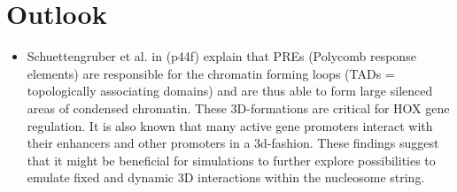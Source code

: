 \chapter{Outlook}
\label{cha:outlook}

\begin{itemize}
    \item Schuettengruber et al. in \cite{schuettengruber2017genome} (p44f) %
    explain that PREs (Polycomb response elements) are responsible for the chromatin forming loops (TADs = topologically associating domains) and are thus able to form large silenced areas of condensed chromatin. These 3D-formations are critical for HOX gene regulation. It is also known that many active gene promoters interact with their enhancers and other promoters in a 3d-fashion. \cite{javierre2016lineage} These findings suggest that it might be beneficial for \ed simulations to further explore possibilities to emulate fixed and dynamic 3D interactions within the nucleosome string.
\end{itemize}
